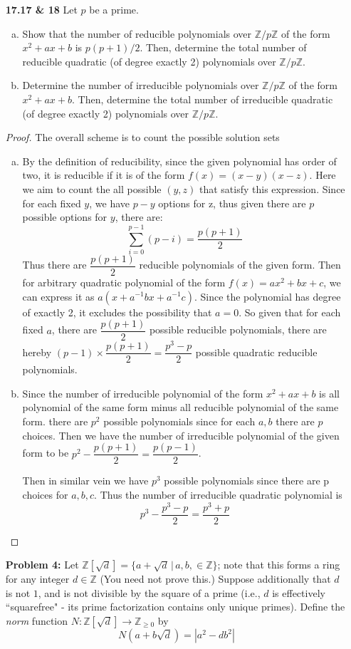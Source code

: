 \documentclass[11pt, oneside]{article}
\newcommand{\Z}{\mathbb Z}
\begin{document}
\begin{enumerate}
\newpage
\item[{\bf 17.17 \& 18}] Let $p$ be a prime.
\begin{enumerate}[a)]
\item Show that the number of reducible polynomials over $\Z/p\Z$ of the form $x^2+ax+b$ is $p(p+1)/2$. Then, determine the total number of reducible quadratic (of degree exactly 2) polynomials over $\Z/p\Z$.
\item Determine the number of irreducible polynomials over $\Z/p\Z$ of the form $x^2+ax+b$. Then, determine the total number of irreducible quadratic (of degree exactly 2) polynomials over $\Z/p\Z$. 
\end{enumerate}
\begin{proof}
The overall scheme is to count the possible solution sets 
\begin{enumerate}[a)]
    \item By the definition of reducibility, since the given polynomial has order of two, it is reducible if it is of the form $f(x)=(x-y)(x-z)$. Here we aim to count the all possible $(y,z)$ that satisfy this expression. Since for each fixed $y$, we have $p-y$ options for z, thus given there are $p$ possible options for $y$, there are: 
    \[\sum_{i=0}^{p-1}(p-i)=\dfrac{p(p+1)}{2}\]
    Thus there are $\dfrac{p(p+1)}{2}$ reducible polynomials of the given form. Then for arbitrary quadratic polynomial of the form $f(x)=ax^2+bx+c$, we can express it as $a(x+a^{-1}bx+a^{-1}c)$. Since the polynomial has degree of exactly 2, it excludes the possibility that $a=0$. So given that for each fixed $a$, there are  $\dfrac{p(p+1)}{2}$ possible reducible polynomials, there are hereby $(p-1)\times  \dfrac{p(p+1)}{2}= \dfrac{p^3-p}{2}$ possible quadratic reducible polynomials.
    \item Since the number of irreducible polynomial of the form $x^2+ax+b$ is all polynomial of the same form minus all reducible polynomial of the same form. there are $p^2$ possible polynomials since for each $a,b$ there are $p$ choices. Then we have the number of irreducible polynomial of the given form to be $p^2-\dfrac{p(p+1)}{2}=\dfrac{p(p-1)}{2}$.
    
    Then in similar vein we have $p^3$ possible polynomials since there are p choices for $a,b,c$. Thus the number of irreducible quadratic polynomial is 
    \[p^3-\dfrac{p^3-p}{2}=\dfrac{p^3+p}{2}\]
\end{enumerate}
\end{proof}

\newpage 
\item[{\bf Problem 4:}] Let $\Z[\sqrt{d}] = \{a+\sqrt{d}\,|\, a,b,\in \Z\}$; note that this forms a ring for any integer $d\in \Z$ (You need not prove this.) Suppose additionally that $d$ is not $1$, and is not divisible by the square of a prime (i.e., $d$ is effectively ``squarefree" - its prime factorization contains only unique primes). Define the {\it norm} function $N:\Z[\sqrt{d}]\rightarrow \Z_{\geq 0}$ by $$N(a+b\sqrt{d}) = |a^2-db^2|$$


\end{enumerate}
\end{document}

